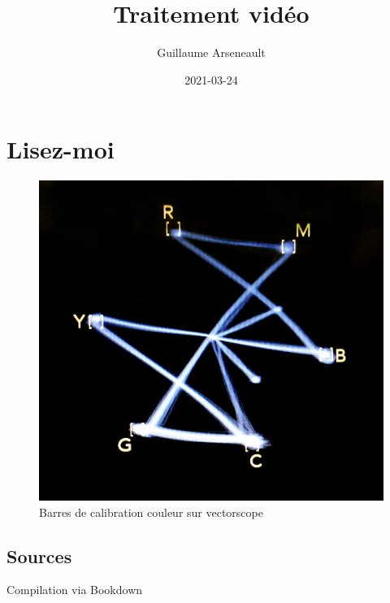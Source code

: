 \documentclass[
  french,
]{book}
\title{Traitement vidéo}
\author{Guillaume Arseneault}
\date{2021-03-24}
\begin{document}
\maketitle

{
\setcounter{tocdepth}{1}
\tableofcontents
}
\hypertarget{lisez-moi}{%
\chapter*{Lisez-moi}\label{lisez-moi}}

\begin{figure}
\centering
\includegraphics{images/vectorscope.jpg}
\caption{\label{fig:unnamed-chunk-1}Barres de calibration couleur sur vectorscope \citep{marsh_ColorBarsVectorscope_2016}}
\end{figure}

\hypertarget{sources}{%
\section*{Sources}\label{sources}}

Compilation via Bookdown \citep{xie_BookdownAuthoringBooks_2020}
\end{document}
